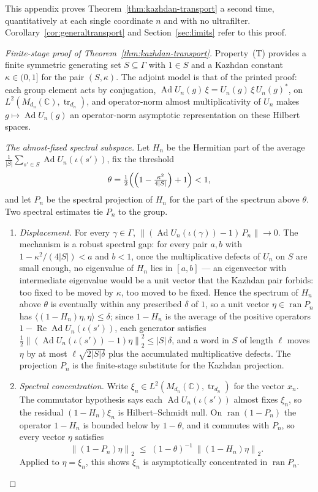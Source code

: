 \documentclass[11pt]{amsart}
\newcommand{\leanverified}[2]{\ignorespaces}
\theoremstyle{definition}
\theoremstyle{remark}
\theoremstyle{plain}
\newcommand{\C}{\mathbb C}
\newcommand{\tr}{\operatorname{tr}}
\newcommand{\Ad}{\operatorname{Ad}}
\newcommand{\opnorm}[1]{\left\lVert #1\right\rVert}
\newcommand{\hsnorm}[1]{\left\lVert #1\right\rVert_{2}}
\begin{document}
This appendix proves Theorem~\ref{thm:kazhdan-transport} a second
time, quantitatively at each single coordinate $n$ and with no
ultrafilter.  Corollary~\ref{cor:generaltransport} and
Section~\ref{sec:limits} refer to this proof.

\begin{proof}[Finite-stage proof of Theorem~\ref{thm:kazhdan-transport}]
Property~\textup{(T)} provides a finite symmetric generating set
$S\subseteq\Gamma$ with $1\in S$ and a Kazhdan constant
$\kappa\in(0,1]$ for the pair $(S,\kappa)$.  The adjoint model is that
of the printed proof: each group element acts by conjugation,
$\Ad U_n(g)\,\xi=U_n(g)\,\xi\,U_n(g)^*$, on
$L^2(M_{d_n}(\C),\tr_{d_n})$, and operator-norm almost multiplicativity
of $U_n$ makes $g\mapsto\Ad U_n(g)$ an operator-norm asymptotic
representation on these Hilbert spaces.

\emph{The almost-fixed spectral subspace.}  Let $H_n$ be the Hermitian part of the
average $\frac1{|S|}\sum_{s'\in S}\Ad U_n(\iota(s'))$, fix the threshold
\[
 \theta=\tfrac12\Bigl(\Bigl(1-\tfrac{\kappa^2}{4|S|}\Bigr)+1\Bigr)<1,
\]
and let $P_n$ be the spectral projection of $H_n$ for the part of the
spectrum above $\theta$.  Two spectral estimates tie $P_n$ to the group.
\begin{enumerate}
\item[(i)] \emph{Displacement.}  For every $\gamma\in\Gamma$,
$\opnorm{(\Ad U_n(\iota(\gamma))-1)\,P_n}\to0$.  The mechanism is a
robust spectral gap: for every pair $a,b$ with
$1-\kappa^2/(4|S|)<a$ and $b<1$, once the multiplicative defects of
$U_n$ on $S$ are small enough, no eigenvalue of $H_n$ lies in $[a,b]$
--- an eigenvector with intermediate eigenvalue would be a unit vector
that the Kazhdan pair forbids: too fixed to be moved by
$\kappa$, too moved to be fixed.
\leanverified{Sofic/WeakMFVectorGNS}{GroupApproximation.WeakMFVectorGNS.hermitianAverage_eventually_no_intermediate_eigenvalues}
Hence the spectrum of $H_n$ above $\theta$ is eventually within any
prescribed $\delta$ of $1$, so a unit vector $\eta\in\operatorname{ran}P_n$
has $\langle(1-H_n)\eta,\eta\rangle\le\delta$; since $1-H_n$ is the
average of the positive operators $1-\operatorname{Re}\Ad U_n(\iota(s'))$,
each generator satisfies
$\tfrac1{2}\hsnorm{(\Ad U_n(\iota(s'))-1)\eta}^2\le|S|\,\delta$, and a word
in $S$ of length $\ell$ moves $\eta$ by at most $\ell\sqrt{2|S|\delta}$
plus the accumulated multiplicative defects.  The projection $P_n$ is
the finite-stage substitute for the Kazhdan projection.
\item[(ii)] \emph{Spectral concentration.}  Write $\xi_n\in L^2(M_{d_n}(\C),\tr_{d_n})$
for the vector $x_n$.  The commutator hypothesis says each
$\Ad U_n(\iota(s'))$ almost fixes $\xi_n$, so the residual
$(1-H_n)\xi_n$ is Hilbert--Schmidt null.  On
$\operatorname{ran}(1-P_n)$ the operator $1-H_n$ is bounded below by
$1-\theta$, and it commutes with $P_n$, so every vector $\eta$
satisfies
\[
 \hsnorm{(1-P_n)\eta}\;\le\;(1-\theta)^{-1}\,\hsnorm{(1-H_n)\eta}.
\]
Applied to $\eta=\xi_n$, this shows $\xi_n$ is asymptotically
concentrated in $\operatorname{ran}P_n$.
\end{enumerate}


\end{proof}
\end{document}
